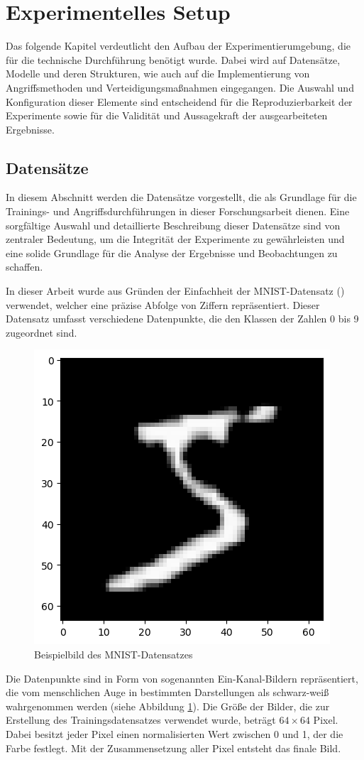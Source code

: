 \section{Experimentelles Setup}
Das folgende Kapitel verdeutlicht den Aufbau der Experimentierumgebung, die für die technische Durchführung benötigt wurde. Dabei wird auf Datensätze, Modelle und deren Strukturen, wie auch auf die Implementierung von Angriffsmethoden und Verteidigungsmaßnahmen eingegangen. Die Auswahl und Konfiguration dieser Elemente sind entscheidend für die Reproduzierbarkeit der Experimente sowie für die Validität und Aussagekraft der ausgearbeiteten Ergebnisse.
\subsection{Datensätze}\label{subsection:datensaetze}
In diesem Abschnitt werden die Datensätze vorgestellt, die als Grundlage für die Trainings- und Angriffsdurchführungen in dieser Forschungsarbeit dienen. Eine sorgfältige Auswahl und detaillierte Beschreibung dieser Datensätze sind von zentraler Bedeutung, um die Integrität der Experimente zu gewährleisten und eine solide Grundlage für die Analyse der Ergebnisse und Beobachtungen zu schaffen.

In dieser Arbeit wurde aus Gründen der Einfachheit der MNIST-Datensatz (\cite{noauthor_mnist_nodate}) verwendet, welcher eine präzise Abfolge von Ziffern repräsentiert. Dieser Datensatz umfasst verschiedene Datenpunkte, die den Klassen der Zahlen 0 bis 9 zugeordnet sind. 

\begin{figure}[H]
	\centering
	\includegraphics[width=0.3\linewidth]{Bilder/5_mnist.png}
	\caption{Beispielbild des MNIST-Datensatzes}
	\label{img:mnist}
\end{figure}

Die Datenpunkte sind in Form von sogenannten Ein-Kanal-Bildern repräsentiert, die vom menschlichen Auge in bestimmten Darstellungen als schwarz-weiß wahrgenommen werden (siehe Abbildung \ref{img:mnist}). Die Größe der Bilder, die zur Erstellung des Trainingsdatensatzes verwendet wurde, beträgt $64 \times 64$ Pixel. Dabei besitzt jeder Pixel einen normalisierten Wert zwischen 0 und 1, der die \glqq Farbe\grqq{} festlegt. Mit der Zusammensetzung aller Pixel entsteht das finale Bild.

